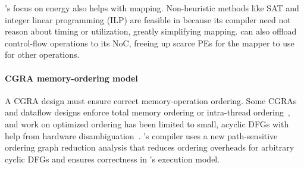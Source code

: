 \riptide's focus on energy also helps with mapping.
% 
Non-heuristic methods like SAT and integer linear programming (ILP) are feasible in \riptide
%
because its compiler need not reason about timing or utilization,
greatly simplifying mapping.
%
\riptide can also offload control-flow operations to its NoC, freeing up scarce PEs for the mapper to use for other operations.



\paragraph{CGRA memory-ordering model}

A CGRA design must ensure correct memory-operation ordering.
%
%
%
Some CGRAs and dataflow designs enforce total memory ordering or intra-thread
ordering~\cite{swanson2003wavescalar, voitsechov2014single}, and work on optimized 
ordering has been limited to small, acyclic DFGs with help from hardware disambiguation~\cite{nachos}.
%
\riptide's compiler uses a new path-sensitive ordering graph reduction analysis
that reduces ordering overheads for arbitrary cyclic DFGs and ensures correctness 
in \riptide's execution model.



